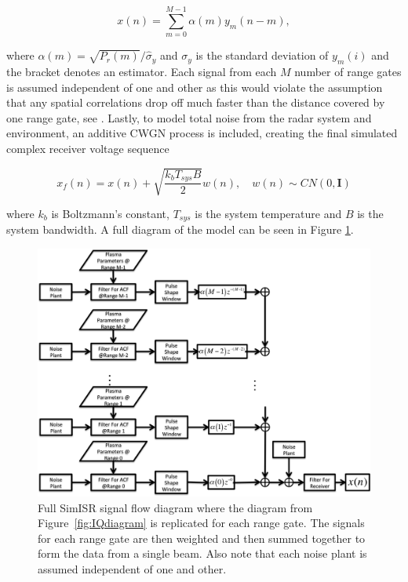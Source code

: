 \documentclass[draft,ras]{agutex}
\begin{document}
\begin{article}
\begin{equation}
\label{eq4}
x(n) = \displaystyle\sum\limits_{m =0}^{M-1} \alpha(m)y_m(n-m),
\end{equation}

\noindent where $\alpha(m) = \sqrt{P_r(m)}/\widehat{\sigma}_y$ and $\sigma_y$ is the standard deviation of $y_m(i)$ and the bracket denotes an estimator. Each signal from each $M$ number of range gates is assumed independent of one and other as this would violate the assumption that any spatial correlations drop off much faster than the distance covered by one range gate, see \citet{RDS:RDS20236}. Lastly, to model total noise from the radar system and environment, an additive CWGN process is included, creating the final simulated complex receiver voltage sequence

\begin{equation}
\label{eq:addnoise}
x_f(n) = x(n) +\sqrt{\frac{k_bT_{sys}B}{2}} w(n), \quad w(n)\sim CN(0,\mathbf{I})
\end{equation}

\noindent where $k_b$ is Boltzmann's constant, $T_{sys}$ is the system temperature and $B$ is the system bandwidth.
A full diagram of the model can be seen in Figure \ref{fig:isrdiag}.

\begin{figure}[!h]
\centering
\includegraphics[width=7.0in]{diagram}
\caption{Full SimISR signal flow diagram where the diagram from Figure~\ref{fig:IQdiagram} is replicated for each range gate. The signals for each range gate are then weighted and then summed together to form the data from a single beam. Also note that each noise plant is assumed independent of one and other.}
\label{fig:isrdiag}
\end{figure}


\end{article}
\end{document}
